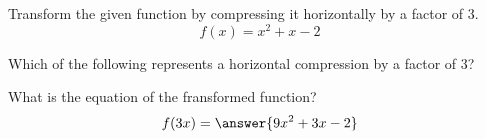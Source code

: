 \documentclass{ximera}
\author{Ivo Terek}
\begin{document}
Transform the given function by compressing it horizontally by a factor of $3$.
\[
f(x)=x^2+x-2
\]
\begin{exercise}
Which of the following represents a horizontal compression by a factor of $3$?
\begin{multipleChoice}
\end{multipleChoice}

\begin{exercise}
What is the equation of the fransformed function?
\[
f(3x)=\answer{9x^2+3x-2}
\]
\end{exercise}
\end{exercise}
\end{document}
